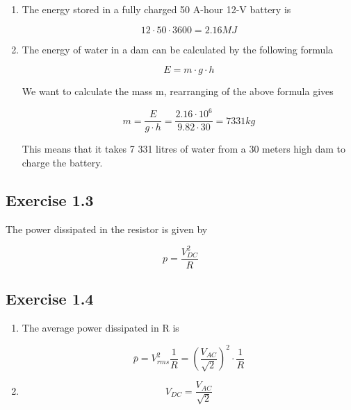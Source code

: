 \documentclass[]{article}
\newcommand*\average[1]{\bar{#1}}
\begin{document}
\begin{enumerate}[label=(\alph*)]
	\item The energy stored in a fully charged 50 A-hour 12-V battery is

	\begin{equation*}
		12 \cdot 50 \cdot 3600 = 2.16 MJ
	\end{equation*}

	\item The energy of water in a dam can be calculated by the following formula
		
	\begin{equation*}
		E =  m \cdot g \cdot h
	\end{equation*}

	We want to calculate the mass m, rearranging of the above formula gives
	
	\begin{equation*}
		m = \dfrac{E}{g \cdot h} = \dfrac{2.16 \cdot 10^6}{9.82 \cdot 30} = 7331 kg
	\end{equation*}
	
	This means that it takes 7 331 litres of water from a 30 meters high dam to charge the battery. 
\end{enumerate}

\subsection*{Exercise 1.3}

The power dissipated in the resistor is given by

\begin{equation*}
	p =  \dfrac{ V _{DC} ^{2} }{ R }
\end{equation*}

\subsection*{Exercise 1.4}

\begin{enumerate}[label=(\alph*)]
	\item The average power dissipated in R is

	\begin{equation*}
		\average{p} =  { V _{rms} ^{2} }\dfrac{ 1 }{ R } = \left( \dfrac{ V _{AC} }{ \sqrt{2} }\right) ^2 \cdot \dfrac{ 1 }{ R }
	\end{equation*}

	\item
	\begin{equation*}
		V _{DC} = \dfrac{ V _{AC} }{ \sqrt{2} }
	\end{equation*}	
 
\end{enumerate}
	
\end{document}
